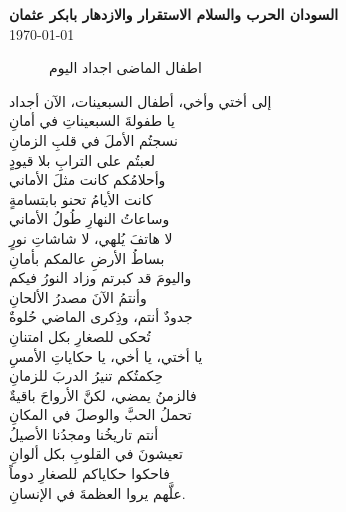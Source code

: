 \documentclass[12pt]{article}
\begin{document}
\begin{center}
{\Huge\textbf{\textcolor{titleColor}{السودان  الحرب والسلام الاستقرار والازدهار }}}
    \vspace{0.5cm}
    \textbf{\textcolor{emphasisColor}{بابكر عثمان}} \\
    \vspace{0.2cm}
    \today
\end{center}


\begin{figure}

\caption{اطفال الماضى اجداد اليوم  }
\end{figure}



إلى أختي وأخي، أطفال السبعينات، الآن أجداد \\

يا طفولةَ السبعيناتِ في أمانِ \\
نسجتُم الأملَ في قلبِ الزمانِ \\
لعبتُم على الترابِ بلا قيودٍ \\
وأحلامُكم كانت مثلَ الأماني \\

كانت الأيامُ تحنو بابتسامةٍ \\
وساعاتُ النهارِ طُولُ الأماني \\
لا هاتفَ يُلهي، لا شاشاتِ نورٍ \\
بساطُ الأرضِ عالمكم بأمانِ \\

واليومَ قد كبرتم وزاد النورُ فيكم \\
وأنتمُ الآنَ مصدرُ الألحانِ \\
جدودٌ أنتم، وذِكرى الماضي حُلوةٌ \\
تُحكى للصغارِ بكل امتنانِ \\

يا أختي، يا أخي، يا حكاياتِ الأمسِ \\
حِكمتُكم تنيرُ الدربَ للزمانِ \\
فالزمنُ يمضي، لكنَّ الأرواحَ باقيةٌ \\
تحملُ الحبَّ والوصلَ في المكانِ \\

أنتم تاريخُنا ومجدُنا الأصيلُ \\
تعيشونَ في القلوبِ بكل ألوانِ \\
فاحكوا حكاياكم للصغارِ دوماً \\
علَّهم يروا العظمةَ في الإنسانِ. \\
\end{document}
